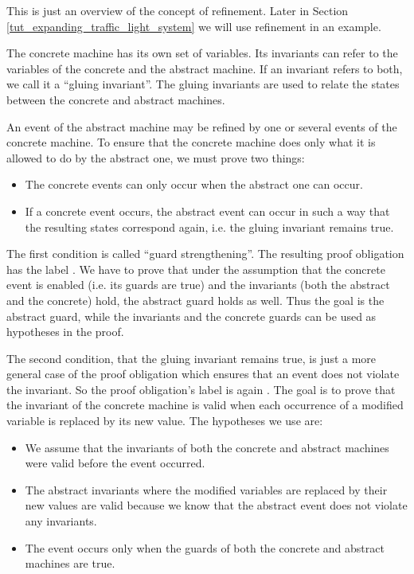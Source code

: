 This is just an overview of the concept of refinement. Later in Section \ref{tut_expanding_traffic_light_system}
we will use refinement in an example.

The concrete machine has its own set of variables. Its invariants can refer to
the variables of the concrete and the abstract machine. If an invariant refers to both,
we call it a ``gluing invariant''. The gluing invariants are
used to relate the states between the concrete and abstract machines.

An event of the abstract machine may be refined by one or several events of the concrete machine.
To ensure that the concrete machine does only what it is allowed to do by the abstract one, we must prove two things:
\begin{itemize}
\item The concrete events can only occur when the abstract one can occur.
\item If a concrete event occurs, the abstract event can occur in such a way that the resulting
  states correspond again, i.e. the gluing invariant remains true.
\end{itemize}

The first condition is called ``guard strengthening''. The resulting proof obligation has the label
. We have to prove that under the assumption that the
concrete event is enabled (i.e. its guards are true) and the invariants (both the abstract and the concrete) 
hold, the abstract guard holds as well. Thus the goal is the abstract guard, while the invariants and the
concrete guards can be used as hypotheses in the proof.

The second condition, that the gluing invariant remains true, is just a more general case of the proof obligation which ensures 
that an event does not violate the invariant. So the proof obligation's label is again 
.
The goal is to prove that the invariant of the concrete machine is valid when each occurrence of a modified variable is replaced by its new value.
The hypotheses we use are:
\begin{itemize}
\item We assume that the invariants of both the concrete and abstract machines were valid before the event occurred.
\item The abstract invariants where the modified variables are replaced by their new values are valid because we know that the abstract event does not violate any invariants.
\item The event occurs only when the guards of both the concrete and abstract machines are true.
\end{itemize}

